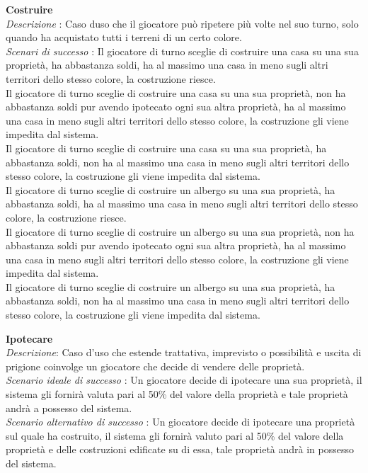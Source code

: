 \documentclass[a4paper]{article}
\begin{document}
\textbf{Costruire}\\
\textit{Descrizione} : Caso duso che il giocatore può ripetere più volte nel suo turno, solo quando ha acquistato tutti i terreni di un certo colore.\\
\textit{Scenari di successo} : Il giocatore di turno sceglie di costruire una casa su una sua proprietà, ha abbastanza soldi, ha al massimo una casa in meno sugli altri territori dello stesso colore, la costruzione riesce.\\
Il giocatore di turno sceglie di costruire una casa su una sua proprietà, non ha abbastanza soldi pur avendo ipotecato ogni sua altra proprietà, ha al massimo una casa in meno sugli altri territori dello stesso colore, la costruzione gli viene impedita dal sistema.\\
Il giocatore di turno sceglie di costruire una casa su una sua proprietà, ha abbastanza soldi, non  ha al massimo una casa in meno sugli altri territori dello stesso colore, la costruzione gli viene impedita dal sistema.\\
Il giocatore di turno sceglie di costruire un albergo  su una sua proprietà, ha abbastanza soldi, ha al massimo una casa in meno sugli altri territori dello stesso colore, la costruzione riesce.\\
Il giocatore di turno sceglie di costruire un albergo su una sua proprietà, non ha abbastanza soldi pur avendo ipotecato ogni sua altra proprietà, ha al massimo una casa in meno sugli altri territori dello stesso colore, la costruzione gli viene impedita dal sistema.\\
Il giocatore di turno sceglie di costruire un albergo  su una sua proprietà, ha abbastanza soldi, non  ha al massimo una casa in meno sugli altri territori dello stesso colore, la costruzione gli viene impedita dal sistema.

\textbf{Ipotecare}\\
\textit{Descrizione}: Caso d'uso che estende trattativa, imprevisto o possibilità e uscita di prigione coinvolge un giocatore che decide di vendere delle proprietà.\\
\textit{Scenario ideale di successo} : Un giocatore decide di ipotecare una sua proprietà, il sistema gli fornirà valuta pari al 50\% del valore della proprietà e tale proprietà andrà a possesso del sistema.\\
\textit{Scenario alternativo  di successo} : Un giocatore decide di ipotecare una proprietà sul quale ha costruito, il sistema gli fornirà valuto pari al 50\% del valore della proprietà e delle costruzioni edificate su di essa, tale proprietà andrà in possesso del sistema.
\end{document}
